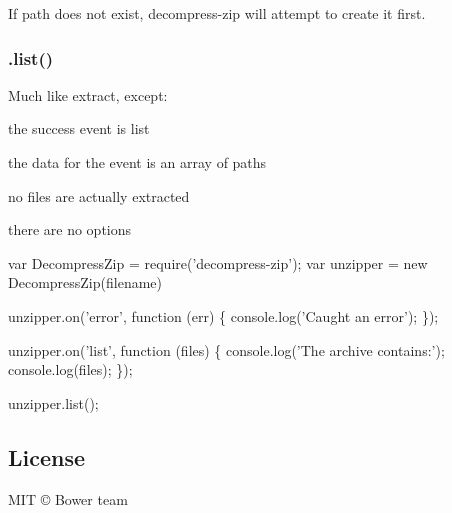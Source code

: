 If {\ttfamily path} does not exist, decompress-\/zip will attempt to create it first.

\subsubsection*{.list()}

Much like extract, except\+:
\begin{DoxyItemize}
\item the success event is {\ttfamily list}
\item the data for the event is an array of paths
\item no files are actually extracted
\item there are no options
\end{DoxyItemize}


\begin{DoxyCode}
var DecompressZip = require('decompress-zip');
var unzipper = new DecompressZip(filename)

unzipper.on('error', function (err) \{
    console.log('Caught an error');
\});

unzipper.on('list', function (files) \{
    console.log('The archive contains:');
    console.log(files);
\});

unzipper.list();
\end{DoxyCode}


\subsection*{License}

M\+IT © Bower team 